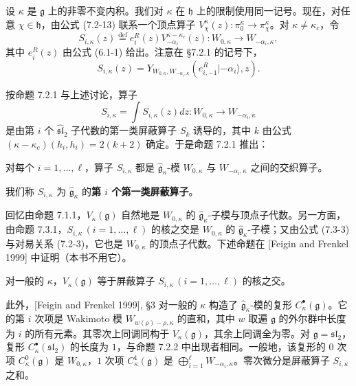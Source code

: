 设 $\kappa$ 是 $\mathfrak{g}$ 上的非零不变内积。我们对 $\kappa$ 在 $\mathfrak{h}$ 上的限制使用同一记号。现在，对任意 $\chi\in\mathfrak{h}$，由公式 (7.2-13) 联系一个顶点算子 $V_\chi^\kappa(z):\pi_0^\kappa\to\pi_\chi^\kappa$。对 $\kappa\ne\kappa_c$，令
\[
    S_{i,\kappa}(z)\overset{\mathrm{def}}{=}e_i^R(z)V_{-\alpha_i}^{\kappa-\kappa_c}(z):W_{0,\kappa}\longrightarrow W_{-\alpha_i,\kappa},
\]
其中 $e_i^R(z)$ 由公式 (6.1-1) 给出。注意在 §7.2.1 的记号下，
\begin{equation}
    S_{i,\kappa}(z)=Y_{W_{0,\kappa},W_{-\alpha_i,\kappa}}(e_{i,-1}^R|-\alpha_i\rangle,z).
    \tag{7.3-3}
\end{equation}

按命题 7.2.1 与上述讨论，算子
\begin{equation}
    S_{i,\kappa}=\int S_{i,\kappa}(z)dz:W_{0,\kappa}\longrightarrow W_{-\alpha_i,\kappa}
    \tag{7.3-4}
\end{equation}
是由第 $i$ 个 $\widehat{\mathfrak{sl}}_2$ 子代数的第一类屏蔽算子 $S_k$ 诱导的，其中 $k$ 由公式 $(\kappa-\kappa_c)(h_i,h_i)=2(k+2)$ 确定。于是命题 7.2.1 推出：

\begin{proposition}
    对每个 $i=1,\dots,\ell$，算子 $S_{i,\kappa}$ 都是 $\hat{\mathfrak{g}}_\kappa$-模 $W_{0,\kappa}$ 与 $W_{-\alpha_i,\kappa}$ 之间的交织算子。
\end{proposition}

我们称 $S_{i,\kappa}$ 为 $\hat{\mathfrak{g}}_\kappa$ 的\textbf{第 $i$ 个第一类屏蔽算子}。

回忆由命题 7.1.1，$V_\kappa(\mathfrak{g})$ 自然地是 $W_{0,\kappa}$ 的 $\hat{\mathfrak{g}}_\kappa$-子模与顶点子代数。另一方面，由命题 7.3.1，$S_{i,\kappa}\,(i=1,\dots,\ell)$ 的核之交是 $W_{0,\kappa}$ 的 $\hat{\mathfrak{g}}_\kappa$-子模；又由公式 (7.3-3) 与对易关系 (7.2-3)，它也是 $W_{0,\kappa}$ 的顶点子代数。下述命题在 [Feigin and Frenkel 1999] 中证明（本书不用它）。

\begin{proposition}
    对一般的 $\kappa$，$V_\kappa(\mathfrak{g})$ 等于屏蔽算子 $S_{i,\kappa}\,(i=1,\dots,\ell)$ 的核之交。
\end{proposition}

此外，[Feigin and Frenkel 1999], §3 对一般的 $\kappa$ 构造了 $\hat{\mathfrak{g}}_\kappa$-模的复形 $C_\kappa^\bullet(\mathfrak{g})$。它的第 $i$ 次项是 Wakimoto 模 $W_{w(\rho)-\rho,\kappa}$ 的直和，其中 $w$ 取遍 $\mathfrak{g}$ 的外尔群中长度为 $i$ 的所有元素。其零次上同调同构于 $V_\kappa(\mathfrak{g})$，其余上同调全为零。对 $\mathfrak{g}=\mathfrak{sl}_2$，复形 $C_\kappa^\bullet(\mathfrak{sl}_2)$ 的长度为 $1$，与命题 7.2.2 中出现者相同。一般地，该复形的 $0$ 次项 $C_\kappa^0(\mathfrak{g})$ 是 $W_{0,\kappa}$，$1$ 次项 $C_\kappa^1(\mathfrak{g})$ 是 $\bigoplus_{i=1}^{\ell}W_{-\alpha_i,\kappa}$。零次微分是屏蔽算子 $S_{i,\kappa}$ 之和。

